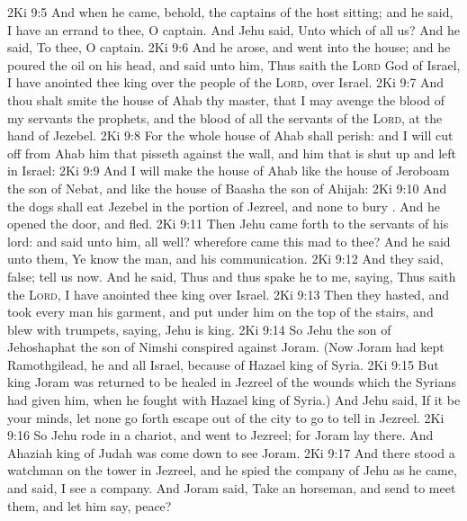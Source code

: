\vs 2Ki 9:5 And when he came, behold, the captains of the host  sitting; and he said, I have an errand to thee, O captain. And Jehu said, Unto which of all us? And he said, To thee, O captain.
\vs 2Ki 9:6 And he arose, and went into the house; and he poured the oil on his head, and said unto him, Thus saith the \textsc{Lord} God of Israel, I have anointed thee king over the people of the \textsc{Lord},  over Israel.
\vs 2Ki 9:7 And thou shalt smite the house of Ahab thy master, that I may avenge the blood of my servants the prophets, and the blood of all the servants of the \textsc{Lord}, at the hand of Jezebel.
\vs 2Ki 9:8 For the whole house of Ahab shall perish: and I will cut off from Ahab him that pisseth against the wall, and him that is shut up and left in Israel:
\vs 2Ki 9:9 And I will make the house of Ahab like the house of Jeroboam the son of Nebat, and like the house of Baasha the son of Ahijah:
\vs 2Ki 9:10 And the dogs shall eat Jezebel in the portion of Jezreel, and  none to bury . And he opened the door, and fled.
\vs 2Ki 9:11 Then Jehu came forth to the servants of his lord: and  said unto him,  all well? wherefore came this mad  to thee? And he said unto them, Ye know the man, and his communication.
\vs 2Ki 9:12 And they said,  false; tell us now. And he said, Thus and thus spake he to me, saying, Thus saith the \textsc{Lord}, I have anointed thee king over Israel.
\vs 2Ki 9:13 Then they hasted, and took every man his garment, and put  under him on the top of the stairs, and blew with trumpets, saying, Jehu is king.
\vs 2Ki 9:14 So Jehu the son of Jehoshaphat the son of Nimshi conspired against Joram. (Now Joram had kept Ramothgilead, he and all Israel, because of Hazael king of Syria.
\vs 2Ki 9:15 But king Joram was returned to be healed in Jezreel of the wounds which the Syrians had given him, when he fought with Hazael king of Syria.) And Jehu said, If it be your minds,  let none go forth  escape out of the city to go to tell  in Jezreel.
\vs 2Ki 9:16 So Jehu rode in a chariot, and went to Jezreel; for Joram lay there. And Ahaziah king of Judah was come down to see Joram.
\vs 2Ki 9:17 And there stood a watchman on the tower in Jezreel, and he spied the company of Jehu as he came, and said, I see a company. And Joram said, Take an horseman, and send to meet them, and let him say,  peace?
